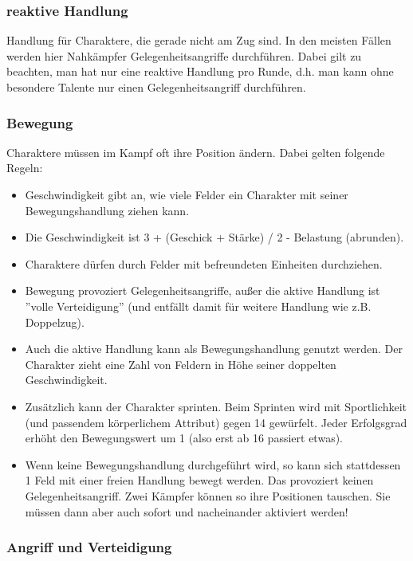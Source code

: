 \documentclass{article}
\begin{document}
\subsubsection{reaktive Handlung}

Handlung für Charaktere, die gerade nicht am Zug sind. In den meisten Fällen werden hier Nahkämpfer
Gelegenheitsangriffe durchführen. Dabei gilt zu beachten, man hat nur eine reaktive Handlung pro Runde, d.h. man kann
ohne besondere Talente nur einen Gelegenheitsangriff durchführen.

\subsubsection{Bewegung}

Charaktere müssen im Kampf oft ihre Position ändern. Dabei gelten folgende Regeln:

\begin{itemize}
\item Geschwindigkeit gibt an, wie viele Felder ein Charakter mit seiner Bewegungshandlung ziehen kann.
\item Die Geschwindigkeit ist 3 + (Geschick + Stärke) / 2 - Belastung (abrunden).
\item Charaktere dürfen durch Felder mit befreundeten Einheiten durchziehen.
\item Bewegung provoziert Gelegenheitsangriffe, außer die aktive Handlung ist ''volle Verteidigung'' (und entfällt damit für weitere Handlung wie z.B. Doppelzug).
\item Auch die aktive Handlung kann als Bewegungshandlung genutzt werden. Der Charakter zieht eine Zahl von Feldern in Höhe seiner doppelten Geschwindigkeit.
\item Zusätzlich kann der Charakter sprinten. Beim Sprinten wird mit Sportlichkeit (und passendem körperlichem Attribut) gegen 14 gewürfelt. Jeder Erfolgsgrad erhöht den Bewegungswert um 1 (also erst ab 16 passiert etwas).
\item Wenn keine Bewegungshandlung durchgeführt wird, so kann sich stattdessen 1 Feld mit einer freien Handlung bewegt werden. Das provoziert keinen Gelegenheitsangriff. Zwei Kämpfer können so ihre Positionen tauschen. Sie müssen dann aber auch sofort und nacheinander aktiviert werden!
\end{itemize}

\subsubsection{Angriff und Verteidigung}
\end{document}
